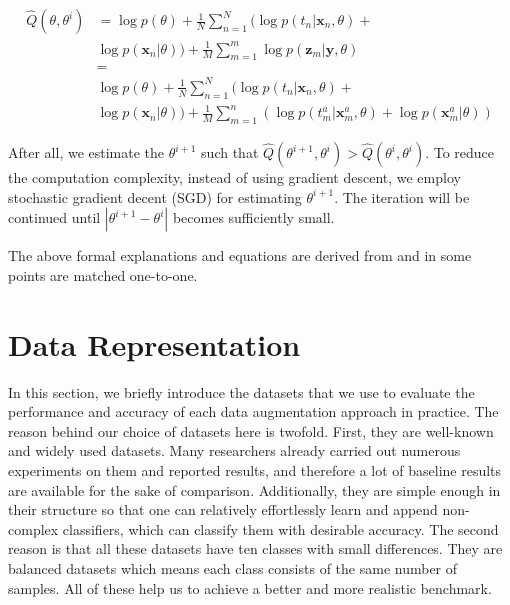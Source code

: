 \begin{equation}
  \begin{split}
    \hat{Q}(\theta, \theta^{i}) &= \log p(\theta)+\frac{1}{N} \sum_{n=1}^{N}(\log p(t_{n} | \mathbf{x}_{n}, \theta)+ \\
    & \log p(\mathbf{x}_{n} | \theta))+\frac{1}{M} \sum_{m=1}^{m} \log p(\mathbf{z}_{m} | \mathbf{y}, \theta) \\
    &= \\
    & \log p(\theta)+\frac{1}{N} \sum_{n=1}^{N}(\log p(t_{n} | \mathbf{x}_{n}, \theta)+\\
    & \log p(\mathbf{x}_{n} | \theta))+ \frac{1}{M} \sum_{m=1}^{n}(\log p(t_{m}^{a} | \mathbf{x}_{m}^{a}, \theta)+\log p(\mathbf{x}_{m}^{a} | \theta))
  \end{split}
\end{equation}

After all, we estimate the $\theta^{i +1}$ such that $\hat{Q}(\theta^{i +1}, \theta^{i}) >
  \hat{Q}(\theta^{i}, \theta^{i})$. To reduce the computation complexity, instead of using
gradient descent, we employ stochastic gradient decent (SGD) for estimating $\theta^{i +1}$. The
iteration will be continued until $|\theta^{i +1} - \theta^{i}|$ becomes sufficiently small.

The above formal explanations and equations are derived from \cite{refrence_bayesian_approach} and in some points are matched one-to-one.

\chapter{Data Representation}
\label{tit:data-representation}
In this section, we briefly introduce the datasets that we use to evaluate the performance and
accuracy of each data
augmentation approach in practice. The reason behind our choice of datasets here is twofold. First,
they are well-known and widely used datasets. Many researchers already carried out numerous
experiments on them and reported results, and therefore a lot of baseline results are available for
the sake of comparison. Additionally, they are simple enough in their structure so that one can
relatively effortlessly learn and append non-complex classifiers, which can classify them with
desirable accuracy. The second reason is that all these datasets have ten classes with small
differences. They are balanced datasets which means each class consists of the same number of
samples. All of these help us to achieve a better and more realistic benchmark.

